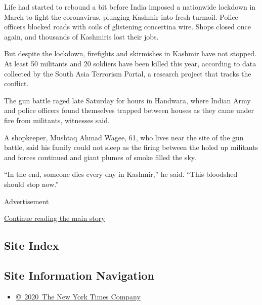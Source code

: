 Life had started to rebound a bit before India imposed a nationwide
lockdown in March to fight the coronavirus, plunging Kashmir into fresh
turmoil. Police officers blocked roads with coils of glistening
concertina wire. Shops closed once again, and thousands of Kashmiris
lost their jobs.

But despite the lockdown, firefights and skirmishes in Kashmir have not
stopped. At least 50 militants and 20 soldiers have been killed this
year, according to data collected by the South Asia Terrorism Portal, a
research project that tracks the conflict.

The gun battle raged late Saturday for hours in Handwara, where Indian
Army and police officers found themselves trapped between houses as they
came under fire from militants, witnesses said.

A shopkeeper, Mushtaq Ahmad Wagee, 61, who lives near the site of the
gun battle, said his family could not sleep as the firing between the
holed up militants and forces continued and giant plumes of smoke filled
the sky.

``In the end, someone dies every day in Kashmir,'' he said. ``This
bloodshed should stop now.''

Advertisement

\protect\hyperlink{after-bottom}{Continue reading the main story}

\hypertarget{site-index}{%
\subsection{Site Index}\label{site-index}}

\hypertarget{site-information-navigation}{%
\subsection{Site Information
Navigation}\label{site-information-navigation}}

\begin{itemize}
\tightlist
\item
  \href{https://help.nytimes.com/hc/en-us/articles/115014792127-Copyright-notice}{©~2020~The
  New York Times Company}
\end{itemize}

